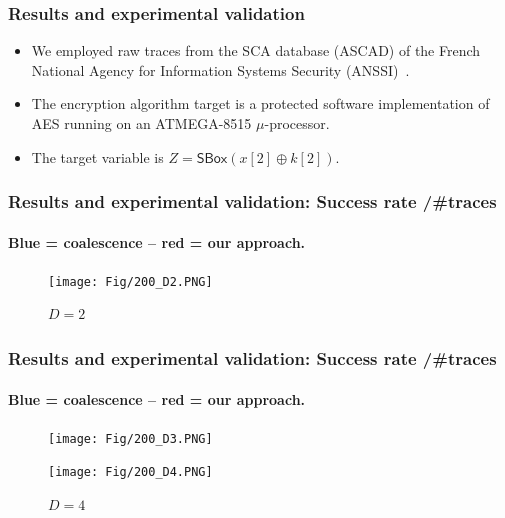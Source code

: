 \documentclass{beamer}
\begin{document}
\begin{frame}

\frametitle{Results and experimental validation}

\begin{itemize}
\item We employed raw traces from the SCA database (ASCAD) of the French National Agency for Information Systems Security (ANSSI)~\cite{emmanuel2018study}.
\pause

\item The encryption algorithm target %
is a protected software implementation of AES  %
running on an \textsc{ATMEGA-8515} $\mu$-processor.%
\pause


\item The target variable is 
$Z = \mathsf{SBox} (x[2] \oplus k[2])$.

\end{itemize}

\end{frame}
\begin{frame}

\frametitle{Results and experimental validation: Success rate /\#traces}
\framesubtitle{Blue = coalescence -- red = our approach.}

\begin{figure}

    

    \texttt{[image: Fig/200\_D2.PNG]}
    \caption{$D=2$}

        
\end{figure}

\end{frame}
\begin{frame}

\frametitle{Results and experimental validation: Success rate /\#traces}
\framesubtitle{Blue = coalescence -- red = our approach.}


\begin{figure}

    \texttt{[image: Fig/200\_D3.PNG]}
    \caption{$D=3$}
    

    
    \texttt{[image: Fig/200\_D4.PNG]}
    \caption{$D=4$}
   
         
\end{figure}

\end{frame}
\end{document}
